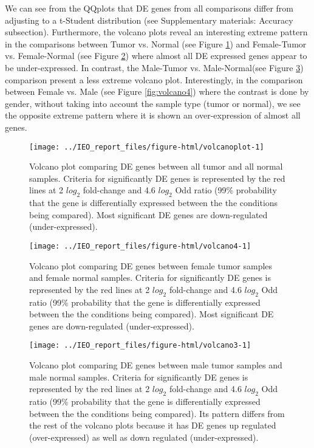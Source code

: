 \documentclass[9pt,twocolumn,twoside]{gsajnl}
\begin{document}
We can see from the QQplots that DE genes from all comparisons differ from adjusting to a t-Student distribution (see Supplementary materials: Accuracy subsection). Furthermore, the volcano plots reveal an interesting extreme pattern in the comparisons between Tumor vs. Normal (see Figure \ref{fig:volcano1}) and Female-Tumor vs. Female-Normal (see Figure \ref{fig:volcano2}) where almost all DE expressed genes appear to be under-expressed. In contrast, the Male-Tumor vs. Male-Normal(see Figure \ref{fig:volcano3}) comparison present a less extreme volcano plot. Interestingly, in the comparison between Female vs. Male (see Figure \ref{fig:volcano4}) where the contrast is done by gender, without taking into account the sample type (tumor or normal), we see the opposite extreme pattern where it is shown an over-expression of almost all genes. 

\begin{figure}
\centering
\texttt{[image: ../IEO\_report\_files/figure-html/volcanoplot-1]}
\caption{Volcano plot comparing DE genes between all tumor and all normal samples. Criteria for significantly DE genes is represented by the red lines at 2 $log_{2}$ fold-change and 4.6  $log_{2}$ Odd ratio (99\% probability that the gene is differentially expressed between the the conditions being compared). Most significant DE genes are down-regulated (under-expressed).}
\label{fig:volcano1}
\end{figure}

\begin{figure}
\centering
\texttt{[image: ../IEO\_report\_files/figure-html/volcano4-1]}
\caption{Volcano plot comparing DE genes between female tumor samples and female normal samples. Criteria for significantly DE genes is represented by the red lines at 2 $log_{2}$ fold-change and 4.6 $log_{2}$ Odd ratio (99\% probability that the gene is differentially expressed between the the conditions being compared). Most significant DE genes are down-regulated (under-expressed).}
\label{fig:volcano2}
\end{figure}

\begin{figure}
\centering
\texttt{[image: ../IEO\_report\_files/figure-html/volcano3-1]}
\caption{Volcano plot comparing DE genes between male tumor samples and male normal samples. Criteria for significantly DE genes is represented by the red lines at 2 $log_{2}$ fold-change and 4.6 $log_{2}$ Odd ratio (99\% probability that the gene is differentially expressed between the the conditions being compared). Its pattern differs from the rest of the volcano plots because it has DE genes up regulated (over-expressed) as well as down regulated (under-expressed).}
\label{fig:volcano3}
\end{figure}
\end{document}
